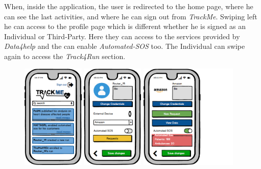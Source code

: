 \documentclass[a4paper]{article}
\begin{document}
When, inside the application, the user is redirected to the home page, where he can see the last activities, and where he can sign out from \textit{TrackMe}. Swiping left he can access to the profile page which is different whether he is signed as an Individual or Third-Party. Here they can access to the services provided by \textit{Data4help} and the can enable \textit{Automated-SOS} too. The Individual can swipe again to access the \textit{Track4Run} section.

\begin{figure}[!htpb]
    	\centering
    	\includegraphics[height=50mm]{images/mockups/HomePage.png}
    	\includegraphics[height=50mm]{images/mockups/IndividualProfile.png}
    	\includegraphics[height=50mm]{images/mockups/ThirdPartyProfile.png}
        \end{figure}
\end{document}
